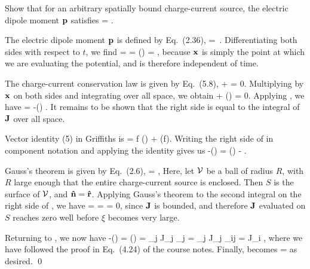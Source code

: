 \begin{statement}{}
	Show that for an arbitrary spatially bound charge-current source, the electric dipole moment $\vb{p}$ satisfies
	\beq
		 = \int \vJ \dcx.
	\eeq
\end{statement}

\begin{solution}
	The electric dipole moment $\vb{p}$ is defined by Eq.~(2.36),
	\beq
		\vp = \int \vx \,\rhox \dcx.
	\eeq
	Differentiating both sides with respect to $t$, we find
	\beqn \label{pder}
		 =  \int \vx \rho \dcx = \int {} (\vx \rho) \dcx
		= \int \vx {} \dcx,
	\eeqn
	because $\vb{x}$ is simply the point at which we are evaluating the potential, and is therefore independent of time.
	
	The charge-current conservation law is given by Eq.~(5.8),
	\beq
		 + \div{\vJ} = 0.
	\eeq
	Multiplying by $\vb{x}$ on both sides and integrating over all space, we obtain
	\beq
		\int \vx {} \dcx + \int \vx (\div{\vJ}) \dcx = 0.
	\eeq
	Applying , we have
	\beqn \label{thing1}
		 = -\int \vx (\div{\vJ}) \dcx.
	\eeqn
	It remains to be shown that the right side is equal to the integral of $\vb{J}$ over all space.
	
	Vector identity (5) in Griffiths is
	\beq
		 = f (\div{\vaa}) + \vaa \vdot (\grad f).
	\eeq
	Writing the right side of  in component notation and applying the identity gives us
	\beqn \label{thing2}
		-\int \xi (\div{\vJ}) \dcx = \int \vJ \vdot (\grad \xi) \dcx - \int \div{(\xi \vJ)} \dcx.
	\eeqn
	
	Gauss's theorem is given by Eq.~(2.6),
	\beq
		\intcV \div{\vv} \dcx = \intS \vv \vdot \nh \dS,
	\eeq
	Here, let $\mathcal{V}$ be a ball of radius $R$, with $R$ large enough that the entire charge-current source is enclosed.  Then $S$ is the surface of $\mathcal{V}$, and $\vb{\hat{n}} = \vb{\hat{r}}$.  Applying Gauss's theorem to the second integral on the right side of , we have
	\beq
		\int \div{(\xi \vJ)} \dcx = \limRi \intcV \div{(\xi \vJ)} \dcx
		= \limRi \intS \xi \vJ \vdot \rh \dS
		= 0,
	\eeq
	since $\vb{J}$ is bounded, and therefore $\vb{J}$ evaluated on $S$ reaches zero well before $\xi$ becomes very large.
	
	Returning to , we now have
	\beq
		-\int \xi (\div{\vJ}) \dcx = \int \vJ \vdot (\grad \xi) \dcx
		= \sum_j \int J_j \partial_j \xi \dcx
		= \sum_j \int J_j \del_{ij} \dcx
		= \int J_i \dcx,
	\eeq
	where we have followed the proof in Eq.~(4.24) of the course notes.  Finally,  becomes
	\beq
		 = \int \vJ \dcx
	\eeq
	as desired. \qed
\end{solution}